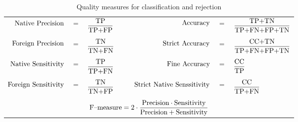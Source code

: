 \documentclass{llncs}
\begin{document}
\begin{table}[!htbp]
\centering
\caption{Quality measures for classification and rejection}
{\small
\begin{tabular}{rclrcl}
  $\textnormal{Native Precision}$ &$=$& $\displaystyle\frac{\textnormal{TP}}{\textnormal{TP+FP}}$ & 
  $\textnormal{Accuracy}$ &$=$& $\displaystyle\frac{\textnormal{TP+TN}}{\textnormal{TP+FN+FP+TN}}$ \\
  &&&&&\\
  $\textnormal{Foreign Precision}$ &$=$& $\displaystyle\frac{\textnormal{TN}}{\textnormal{TN+FN}}$ &
  $\textnormal{Strict Accuracy}$ &$=$& $\displaystyle\frac{\textnormal{CC+TN}}{\textnormal{TP+FN+FP+TN}}$ \\
  &&&&&\\
  $\textnormal{Native Sensitivity}$ &$=$& $\displaystyle\frac{\textnormal{TP}}{\textnormal{TP+FN}}$ &
  $\textnormal{Fine Accuracy}$ &$=$& $\displaystyle\frac{\textnormal{CC}}{\textnormal{TP}}$ \\
  &&&&&\\
  $\textnormal{Foreign Sensitivity}$ &$=$& $\displaystyle\frac{\textnormal{TN}}{\textnormal{TN+FP}}$ &
  $\hspace{18pt}\textnormal{Strict Native Senssitivity}$ &$=$& $\displaystyle\frac{\textnormal{CC}}{\textnormal{TP+FN}}$\\
  &&&&&\\
  \multicolumn{6}{c}{$\textnormal{F--measure}=2\cdot\displaystyle\frac{\textnormal{Precision}\cdot\textnormal{Sensitivity}}{\textnormal{Precision}+\textnormal{Sensitivity}}$}\\
\end{tabular}
}
\label{tab:measures}
\end{table}
\end{document}
